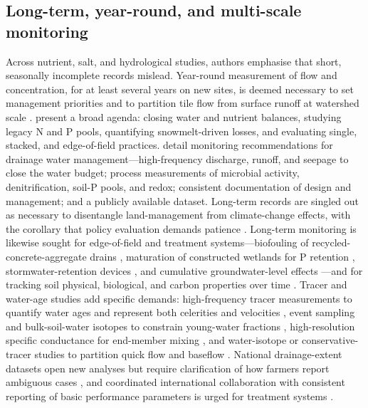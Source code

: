 \documentclass[11pt]{article}
\begin{document}
\subsection{Long-term, year-round, and multi-scale monitoring}

Across nutrient, salt, and hydrological studies, authors emphasise that short,
seasonally incomplete records mislead. Year-round measurement of flow and
concentration, for at least several years on new sites, is deemed necessary to set
management priorities and to partition tile flow from surface runoff at watershed
scale \parencite{Kladivko2001}. \textcite{Sharpley2019} present a broad agenda:
closing water and nutrient balances, studying legacy N and P pools,
quantifying snowmelt-driven losses, and evaluating single, stacked, and
edge-of-field practices. \textcite{Frankenberger2024} detail monitoring
recommendations for drainage water management---high-frequency discharge, runoff,
and seepage to close the water budget; process measurements of microbial activity,
denitrification, soil-P pools, and redox; consistent documentation of design and
management; and a publicly available dataset. Long-term records are singled out as
necessary to disentangle land-management from climate-change effects, with the
corollary that policy evaluation demands patience
\parencite{Bauwe2020,Kelley2017,Gillingham2000,Lemke2011}. Long-term monitoring is
likewise sought for edge-of-field and treatment systems---biofouling of
recycled-concrete-aggregate drains \parencite{McCulloch2017}, maturation of
constructed wetlands for P retention \parencite{Mendes2020}, stormwater-retention
devices \parencite{Xu2022}, and cumulative groundwater-level effects
\parencite{Okuda2020}---and for tracking soil physical, biological, and carbon
properties over time \parencite{Frankl2023,Furukawa2008}. Tracer and water-age
studies add specific demands: high-frequency tracer measurements to quantify water
ages and represent both celerities and velocities \parencite{Williams2021},
event sampling and bulk-soil-water isotopes to constrain young-water fractions
\parencite{DimitrovaPetrova2020}, high-resolution specific conductance for
end-member mixing \parencite{Kronholm2015,Schilling2019}, and water-isotope or
conservative-tracer studies to partition quick flow and baseflow
\parencite{Frederiksen2023}. National drainage-extent datasets open new analyses
but require clarification of how farmers report ambiguous cases
\parencite{Jame2022}, and coordinated international collaboration with consistent
reporting of basic performance parameters is urged for treatment systems
\parencite{Messer2021,Sims1998}.
\end{document}
